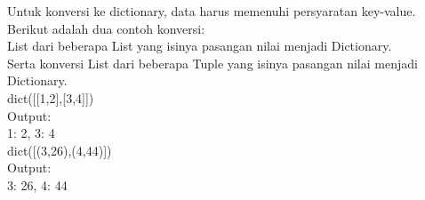 Untuk konversi ke dictionary, data harus memenuhi persyaratan key-value. Berikut adalah dua contoh konversi:\\
List dari beberapa List yang isinya pasangan nilai menjadi Dictionary. \\

Serta konversi List dari beberapa Tuple yang isinya pasangan nilai menjadi Dictionary.\\
dict([[1,2],[3,4]])\\
Output:\\

{1: 2, 3: 4}\\
dict([(3,26),(4,44)])\\
Output:\\

{3: 26, 4: 44}\\









